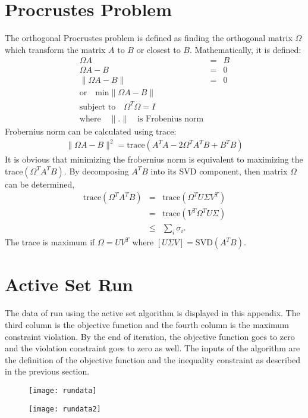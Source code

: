 \begin{appendices}
\chapter{Procrustes Problem}
The orthogonal Procrustes problem is defined as finding the orthogonal matrix $\Omega$ which transform the matrix $A$ to $B$ or closest to $B$. Mathematically, it is defined:
\begin{eqnarray}
\Omega A&=&B \\
\Omega A-B&=&0 \\ \nonumber
\|\Omega A-B\|&=&0 \\ \nonumber
\mbox{or} \quad \mbox{min} \|\Omega A-B\|&&  \\ \nonumber
\mbox{subject to} \quad \Omega^{T}\Omega=I \\ \nonumber
\mbox{where} \quad \|.\| \quad \mbox{is Frobenius norm}
\end{eqnarray}
Frobernius norm can be calculated using trace:
\begin{eqnarray}
\|\Omega A-B\|^{2}=\mbox{trace}(A^{T}A-2\Omega^{T}A^{T}B+B^{T}B)
\end{eqnarray}
It is obvious that minimizing the frobernius norm is equivalent to maximizing the trace$(\Omega^{T}A^{T}B)$. By decomposing $A^{T}B$ into its SVD component, then matrix $\Omega$ can be determined,
\begin{eqnarray}
\mbox{trace}(\Omega^{T} A^{T} B)&=&\mbox{trace}(\Omega^{T} U \Sigma V^{T}) \\ \nonumber
&=&\mbox{trace}(V^{T}\Omega^{T} U \Sigma) \\ \nonumber
&\leq& \sum_{i} \sigma_{i}.
\end{eqnarray}
The trace is maximum if $\Omega=U V^{T}$ where $[U \Sigma V]=\mbox{SVD}(A^{T}B)$. 
\chapter{Active Set Run}
The data of run using the active set algorithm is displayed in this appendix. The third column is the objective function and the fourth column is the maximum constraint violation. By the end of iteration, the objective function goes to zero and the violation constraint goes to zero as well. The inputs of the algorithm are the definition of the objective function and the inequality constraint as described in the previous section.
\begin{figure}[h!]
\centering
 \texttt{[image: rundata]}
\label{fig:rundata}
\end{figure}
\begin{figure}[h!]
\centering
 \texttt{[image: rundata2]}
\label{fig:rundata2}
\end{figure}

\end{appendices}
